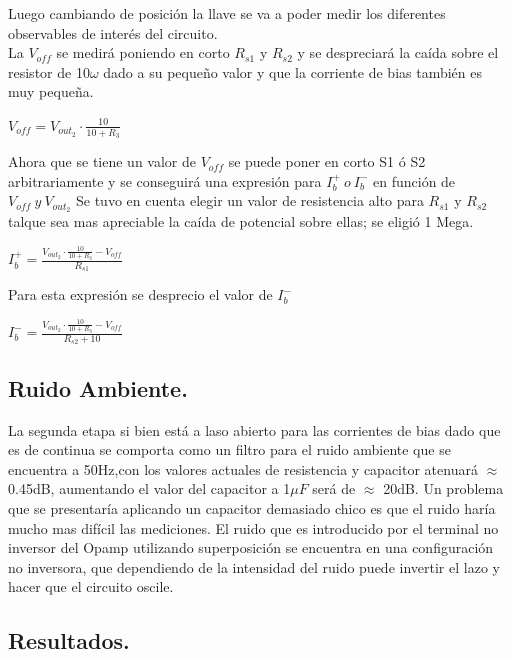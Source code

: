 Luego cambiando de posición la llave se va a poder medir los diferentes observables de interés del circuito.\\
La $V_{off}$ se medirá poniendo en corto $R_{s1}$ y $R_{s2}$ y se despreciará la caída sobre el resistor de 10$\omega$ dado a su pequeño valor y que la corriente de bias también es muy pequeña.\\
\begin{center}$V_{off}=V_{out_2} \cdot \frac{10}{10+R_3} $\end{center}
Ahora que se tiene un valor de $V_{off}$ se  puede poner en corto S1 ó S2 arbitrariamente y se conseguirá una expresión para $ I_b^+ \ o \  I_b^-$ en función de $V_{off} \ y \ V_{out_2}$
Se tuvo en cuenta elegir un valor de resistencia alto para $R_{s1}$ y $R_{s2}$ talque sea mas apreciable la caída de potencial sobre ellas; se eligió 1 Mega.\\
\begin{center}$I_b^+=\frac{V_{out_2} \cdot \frac{10}{10+R_3}-V_{off}}{R_{s1}}$\end{center}
Para esta expresión se desprecio el valor de $I_b^-$
\begin{center}$I_b^-=\frac{V_{out_2} \cdot \frac{10}{10+R_3}-V_{off}}{R_{s2}+10}$\end{center}

\subsection{Ruido Ambiente.}
La segunda etapa si bien está a laso abierto para las corrientes de bias dado que es de continua se comporta como un filtro para el ruido ambiente que se encuentra a 50Hz,con los valores actuales de resistencia y capacitor atenuará $\approx$ 0.45dB, aumentando el valor del capacitor a 1$\mu F$ será de  $\approx$ 20dB.
Un problema que se presentaría aplicando un capacitor demasiado chico es que el ruido haría mucho mas difícil las mediciones.
El ruido que es introducido por el terminal no inversor del Opamp utilizando superposición se encuentra en una configuración no inversora, que dependiendo de la intensidad del ruido puede invertir el lazo y hacer que el circuito oscile.
\subsection{Resultados.}
